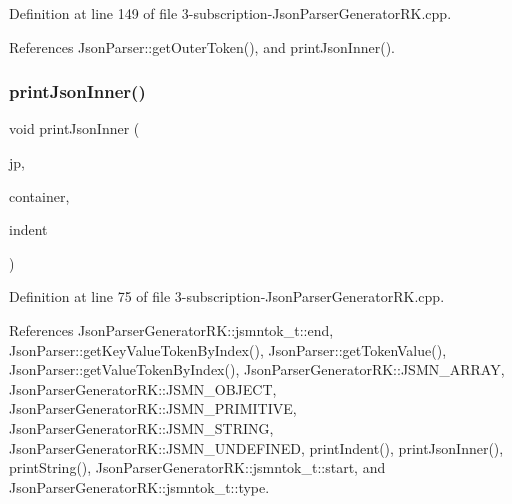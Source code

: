 Definition at line 149 of file 3-\/subscription-\/\+Json\+Parser\+Generator\+R\+K.\+cpp.



References Json\+Parser\+::get\+Outer\+Token(), and print\+Json\+Inner().

\mbox{\label{3-subscription-_json_parser_generator_r_k_8cpp_a7a86f133587ae90abe048be568db828f}} 
\subsubsection{\texorpdfstring{print\+Json\+Inner()}{printJsonInner()}}
{\footnotesize\ttfamily void print\+Json\+Inner (\begin{DoxyParamCaption}\item[{\hyperlink{class_json_parser}{Json\+Parser} \&}]{jp,  }\item[{const \hyperlink{struct_json_parser_generator_r_k_1_1jsmntok__t}{Json\+Parser\+Generator\+R\+K\+::jsmntok\+\_\+t} $\ast$}]{container,  }\item[{size\+\_\+t}]{indent }\end{DoxyParamCaption})}



Definition at line 75 of file 3-\/subscription-\/\+Json\+Parser\+Generator\+R\+K.\+cpp.



References Json\+Parser\+Generator\+R\+K\+::jsmntok\+\_\+t\+::end, Json\+Parser\+::get\+Key\+Value\+Token\+By\+Index(), Json\+Parser\+::get\+Token\+Value(), Json\+Parser\+::get\+Value\+Token\+By\+Index(), Json\+Parser\+Generator\+R\+K\+::\+J\+S\+M\+N\+\_\+\+A\+R\+R\+AY, Json\+Parser\+Generator\+R\+K\+::\+J\+S\+M\+N\+\_\+\+O\+B\+J\+E\+CT, Json\+Parser\+Generator\+R\+K\+::\+J\+S\+M\+N\+\_\+\+P\+R\+I\+M\+I\+T\+I\+VE, Json\+Parser\+Generator\+R\+K\+::\+J\+S\+M\+N\+\_\+\+S\+T\+R\+I\+NG, Json\+Parser\+Generator\+R\+K\+::\+J\+S\+M\+N\+\_\+\+U\+N\+D\+E\+F\+I\+N\+ED, print\+Indent(), print\+Json\+Inner(), print\+String(), Json\+Parser\+Generator\+R\+K\+::jsmntok\+\_\+t\+::start, and Json\+Parser\+Generator\+R\+K\+::jsmntok\+\_\+t\+::type.

